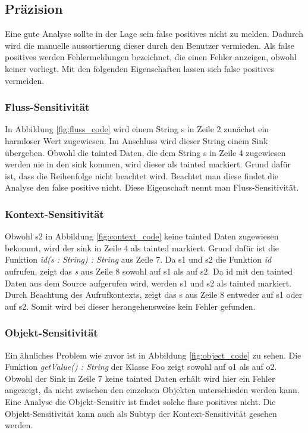 \documentclass[runningheads]{llncs}
\begin{document}
\subsection{Präzision}
Eine gute Analyse sollte in der Lage sein false positives nicht zu melden. Dadurch wird die manuelle aussortierung dieser durch den Benutzer vermieden. Als false positives werden Fehlermeldungen bezeichnet, die einen Fehler anzeigen, obwohl keiner vorliegt. Mit den folgenden Eigenschaften lassen sich false positives vermeiden.
\subsubsection{Fluss-Sensitivität}
In Abbildung \ref{fig:fluss_code} wird einem String s in Zeile 2 zunächst ein harmloser Wert zugewiesen. Im Anschluss wird dieser String einem Sink übergeben. Obwohl die tainted Daten, die dem String s in Zeile 4 zugewiesen werden nie in den sink kommen, wird dieser als tainted markiert. Grund dafür ist, dass die Reihenfolge nicht beachtet wird. Beachtet man diese findet die Analyse den false positive nicht. Diese Eigenschaft nennt man Fluss-Sensitivität.

\subsubsection{Kontext-Sensitivität}
Obwohl s2 in Abbildung \ref{fig:context_code} keine tainted Daten zugewiesen bekommt, wird der sink in Zeile 4 als tainted markiert. Grund dafür ist die Funktion \emph{id(s : String) : String} aus Zeile 7. Da s1 und s2 die Funktion \emph{id} aufrufen, zeigt das \emph{s} aus Zeile 8 sowohl auf s1 als auf s2. Da id mit den tainted Daten aus dem Source aufgerufen wird, werden s1 und s2 als tainted markiert. Durch Beachtung des Aufrufkontexts, zeigt das s aus Zeile 8 entweder auf s1 oder auf s2. Somit wird bei dieser herangehensweise kein Fehler gefunden.

\subsubsection{Objekt-Sensitivität}
Ein ähnliches Problem wie zuvor ist in Abbildung \ref{fig:object_code} zu sehen. Die Funktion \emph{getValue() : String} der Klasse Foo zeigt sowohl auf o1 als auf o2. Obwohl der Sink in Zeile 7 keine tainted Daten erhält wird hier ein Fehler angezeigt, da nicht zwischen den einzelnen Objekten unterschieden werden kann. Eine Analyse die Objekt-Sensitiv ist findet solche flase positives nicht. Die Objekt-Sensitivität kann auch als Subtyp der Kontext-Sensitivität gesehen werden.
\end{document}
